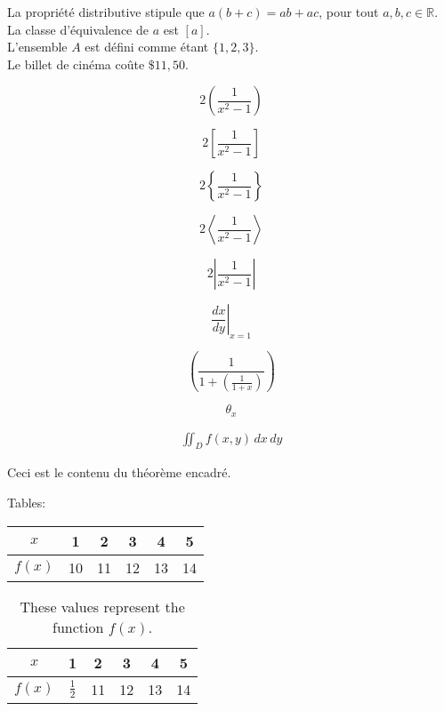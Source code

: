 \documentclass[11pt]{article}
\begin{document}
La propriété distributive stipule que $a(b+c) = ab + ac$, pour tout $a, b, c \in\mathbb{R}$. \\[6pt]

La classe d'équivalence de $a$ est $[a]$. \\[6pt]

L'ensemble $A$ est défini comme étant $\{1,2,3\}$. \\[6pt]

Le billet de cinéma coûte $\$11,50$.

\vspace{1cm}


$$2\left(\frac{1}{x^2-1}\right)$$

$$2\left[\frac{1}{x^2-1}\right]$$

$$2\left\{\frac{1}{x^2-1}\right\}$$

$$2\left\langle	\frac{1}{x^2-1}\right\rangle$$

$$2\left	| \frac{1}{x^2 - 1}\right |	$$

$$\left.\frac{dx}{dy}\right|_{x=1}$$

$$\left(\frac{1}{1+\left(\frac{1}{1+x}\right)}\right)$$

$${\theta}_{x}$$

\begin{align*}
    \iint_{D} f(x, y) \,dx\,dy
\end{align*}


\vspace{1cm}


\begin{boxedtheorem}
    Ceci est le contenu du théorème encadré.
\end{boxedtheorem} 


\hspace{1cm}



Tables:\\



\begin{tabular}{|c|c|c|c|c|c|}
\hline
$x$ & 1 & 2 & 3 & 4 &  5 \\ \hline
$f(x)$ & 10 & 11 & 12 & 13 & 14 \\ \hline



\end{tabular}

\vspace{1cm}

\begin{table}[H]
\centering
\def\arraystretch{1.5}
\begin{tabular}{|c|c|c|c|c|c|}
\hline
$x$ & 1 & 2 & 3 & 4 &  5 \\ \hline
$f(x)$ & $\frac{1}{2}$ & 11 & 12 & 13 & 14 \\ \hline
\end{tabular}
\caption{These values represent the function $f(x)$.}
\end{table}
\end{document}
